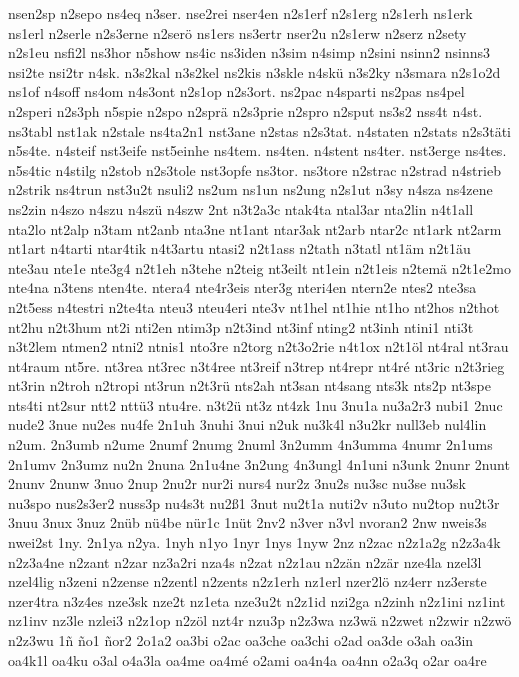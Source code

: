 {nsen2sp
n2sepo
ns4eq
n3ser.
nse2rei
nser4en
n2s1erf
n2s1erg
n2s1erh
ns1erk
ns1erl
n2serle
n2s3erne
n2serö
ns1ers
ns3ertr
nser2u
n2s1erw
n2serz
n2sety
n2s1eu
nsfi2l
ns3hor
n5show
ns4ic
ns3iden
n3sim
n4simp
n2sini
nsinn2
nsinns3
nsi2te
nsi2tr
n4sk.
n3s2kal
n3s2kel
ns2kis
n3skle
n4skü
n3s2ky
n3smara
n2s1o2d
ns1of
n4soff
ns4om
n4s3ont
n2s1op
n2s3ort.
ns2pac
n4sparti
ns2pas
ns4pel
n2speri
n2s3ph
n5spie
n2spo
n2sprä
n2s3prie
n2spro
n2sput
ns3s2
nss4t
n4st.
ns3tabl
nst1ak
n2stale
ns4ta2n1
nst3ane
n2stas
n2s3tat.
n4staten
n2stats
n2s3täti
n5s4te.
n4steif
nst3eife
nst5einhe
ns4tem.
ns4ten.
n4stent
ns4ter.
nst3erge
ns4tes.
n5s4tic
n4stilg
n2stob
n2s3tole
nst3opfe
ns3tor.
ns3tore
n2strac
n2strad
n4strieb
n2strik
ns4trun
nst3u2t
nsuli2
ns2um
ns1un
ns2ung
n2s1ut
n3sy
n4sza
ns4zene
ns2zin
n4szo
n4szu
n4szü
n4szw
2nt
n3t2a3c
ntak4ta
ntal3ar
nta2lin
n4t1all
nta2lo
nt2alp
n3tam
nt2anb
nta3ne
nt1ant
ntar3ak
nt2arb
ntar2c
nt1ark
nt2arm
nt1art
n4tarti
ntar4tik
n4t3artu
ntasi2
n2t1ass
n2tath
n3tatl
nt1äm
n2t1äu
nte3au
nte1e
nte3g4
n2t1eh
n3tehe
n2teig
nt3eilt
nt1ein
n2t1eis
n2temä
n2t1e2mo
nte4na
n3tens
nten4te.
ntera4
nte4r3eis
nter3g
nteri4en
ntern2e
ntes2
nte3sa
n2t5ess
n4testri
n2te4ta
nteu3
nteu4eri
nte3v
nt1hel
nt1hie
nt1ho
nt2hos
n2thot
nt2hu
n2t3hum
nt2i
nti2en
ntim3p
n2t3ind
nt3inf
nting2
nt3inh
ntini1
nti3t
n3t2lem
ntmen2
ntni2
ntnis1
nto3re
n2torg
n2t3o2rie
n4t1ox
n2t1öl
nt4ral
nt3rau
nt4raum
nt5re.
nt3rea
nt3rec
n3t4ree
nt3reif
n3trep
nt4repr
nt4ré
nt3ric
n2t3rieg
nt3rin
n2troh
n2tropi
nt3run
n2t3rü
nts2ah
nt3san
nt4sang
nts3k
nts2p
nt3spe
nts4ti
nt2sur
ntt2
nttü3
ntu4re.
n3t2ü
nt3z
nt4zk
1nu
3nu1a
nu3a2r3
nubi1
2nuc
nude2
3nue
nu2es
nu4fe
2n1uh
3nuhi
3nui
n2uk
nu3k4l
n3u2kr
null3eb
nul4lin
n2um.
2n3umb
n2ume
2numf
2numg
2numl
3n2umm
4n3umma
4numr
2n1ums
2n1umv
2n3umz
nu2n
2nuna
2n1u4ne
3n2ung
4n3ungl
4n1uni
n3unk
2nunr
2nunt
2nunv
2nunw
3nuo
2nup
2nu2r
nur2i
nurs4
nur2z
3nu2s
nu3sc
nu3se
nu3sk
nu3spo
nus2s3er2
nuss3p
nu4s3t
nu2ß1
3nut
nu2t1a
nuti2v
n3uto
nu2top
nu2t3r
3nuu
3nux
3nuz
2nüb
nü4be
nür1c
1nüt
2nv2
n3ver
n3vl
nvoran2
2nw
nweis3s
nwei2st
1ny.
2n1ya
n2ya.
1nyh
n1yo
1nyr
1nys
1nyw
2nz
n2zac
n2z1a2g
n2z3a4k
n2z3a4ne
n2zant
n2zar
nz3a2ri
nza4s
n2zat
n2z1au
n2zän
n2zär
nze4la
nzel3l
nzel4lig
n3zeni
n2zense
n2zentl
n2zents
n2z1erh
nz1erl
nzer2lö
nz4err
nz3erste
nzer4tra
n3z4es
nze3sk
nze2t
nz1eta
nze3u2t
n2z1id
nzi2ga
n2zinh
n2z1ini
nz1int
nz1inv
nz3le
nzlei3
n2z1op
n2zöl
nzt4r
nzu3p
n2z3wa
nz3wä
n2zwet
n2zwir
n2zwö
n2z3wu
1ñ
ño1
ñor2
2o1a2
oa3bi
o2ac
oa3che
oa3chi
o2ad
oa3de
o3ah
oa3in
oa4k1l
oa4ku
o3al
o4a3la
oa4me
oa4mé
o2ami
oa4n4a
oa4nn
o2a3q
o2ar
oa4re
}
